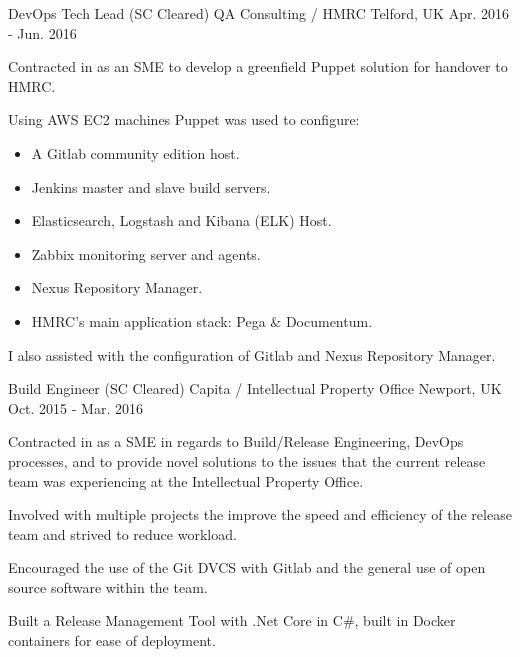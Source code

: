 \begin{cventries}
	\cventry
	{DevOps Tech Lead (SC Cleared)} %
	{QA Consulting / HMRC} %
	{Telford, UK} %
	{Apr. 2016 - Jun. 2016} %
	{
		\begin{cvitems} %
		\item {Contracted in as an SME to develop a greenfield Puppet solution for handover to HMRC.}
		\item {Using AWS EC2 machines Puppet was used to configure:}
			\begin{itemize}
				\item {A Gitlab community edition host.}
				\item {Jenkins master and slave build servers.}
				\item {Elasticsearch, Logstash and Kibana (ELK) Host.}
				\item {Zabbix monitoring server and agents.}
				\item {Nexus Repository Manager.}
				\item {HMRC's main application stack: Pega \& Documentum.}
			\end{itemize}
		\item {I also assisted with the configuration of Gitlab and Nexus Repository Manager.}
		\end{cvitems}
	}

  \cventry
    {Build Engineer (SC Cleared)} %
    {Capita / Intellectual Property Office} %
    {Newport, UK} %
    {Oct. 2015 - Mar. 2016} %
    {
	    \begin{cvitems} %
	    \item {Contracted in as a SME in regards to Build/Release Engineering, DevOps processes, and to provide novel solutions to the issues that the current release team was experiencing at the Intellectual Property Office.}
	    \item {Involved with multiple projects the improve the speed and efficiency of the release team and strived to reduce workload.}
	    \item {Encouraged the use of the Git DVCS with Gitlab and the general use of open source software within the team.}
	    \item {Built a Release Management Tool with .Net Core in C\#, built in Docker containers for ease of deployment.}
	    \end{cvitems}
    }


\end{cventries}
